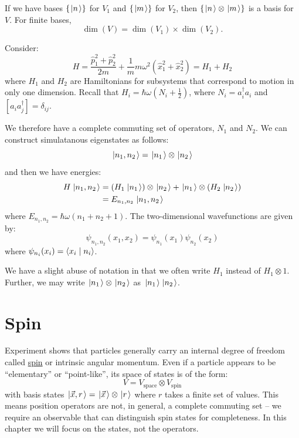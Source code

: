 \documentclass[../Main.tex]{subfiles}
\begin{document}
\begin{remark}
    If we have bases $\{\left.\left|n\right.\right\rangle\}$ for $V_1$ and $\{\left.\left|m\right.\right\rangle\}$ for $V_2$, then $\{\left.\left|n\right.\right\rangle \otimes \left.\left|m\right.\right\rangle\}$ is a basis for $V$. For finite bases,
    \begin{equation*}
        \dim(V) = \dim(V_1) \times \dim(V_2).
    \end{equation*}
\end{remark}
\begin{example}
    Consider:
    \begin{equation*}
        H = \frac{\hat{p}_1^2 + \hat{p}_2^2}{2m} + \frac1m m \omega^2\left(\hat{x}_1^2 + \hat{x}_2^2\right) = H_1 + H_2
    \end{equation*}
    where $H_1$ and $H_2$ are Hamiltonians for subsystems that correspond to motion in only one dimension. Recall that $H_i = \hbar \omega\left(N_i + \frac12\right)$, where $N_i = a_i^\dagger a_i$ and $[a_i a_j^\dagger] = \delta_{ij}$.

    We therefore have a complete commuting set of operators, $N_1$ and $N_2$. We can construct simulatanous eigenstates as follows:
    \begin{equation*}
        \left.\left|n_1, n_2\right.\right\rangle = \left.\left|n_1\right.\right\rangle \otimes \left.\left|n_2\right.\right\rangle
    \end{equation*}
    and then we have energies:
    \begin{align*}
        H\left.\left|n_1, n_2\right.\right\rangle &= \left(H_1 \left.\left|n_1\right.\right\rangle\right) \otimes \left.\left|n_2\right.\right\rangle + \left.\left|n_1\right.\right\rangle \otimes \left(H_2 \left.\left|n_2\right.\right\rangle\right) \\
        &= E_{n_1, n_2} \left.\left|n_1, n_2\right.\right\rangle
    \end{align*}
    where $E_{n_1, n_2} = \hbar \omega \left(n_1 + n_2 + 1\right)$. The two-dimensional wavefunctions are given by:
    \begin{equation*}
        \psi_{n_1, n_2}(x_1, x_2) = \psi_{n_1}(x_1) \psi_{n_2}(x_2)
    \end{equation*}
    where $\psi_{n_i}(x_i) = \langle x_i\mid n_i\rangle$.
\end{example}
\begin{remark}
    We have a slight abuse of notation in that we often write $H_1$ instead of $H_1 \otimes 1$. Further, we may write $\left.\left|n_1\right.\right\rangle \otimes \left.\left|n_2\right.\right\rangle$ as $\left.\left|n_1\right.\right\rangle \left.\left|n_2\right.\right\rangle$.
\end{remark}
\section{Spin}
Experiment shows that particles generally carry an internal degree of freedom called \underline{spin} or intrinsic angular momentum. Even if a particle appears to be ``elementary'' or ``point-like'', its space of states is of the form:
\begin{equation*}
    V = V_{\text{space}} \otimes V_{\text{spin}}
\end{equation*}
with basis states $\left.\left|\vec{x}, r\right.\right\rangle = \left.\left|\vec{x}\right.\right\rangle \otimes \left.\left|r\right.\right\rangle$ where $r$ takes a finite set of values. This means position operators are not, in general, a complete commuting set -- we require an observable that can distinguish spin states for completeness. In this chapter we will focus on the states, not the operators.
\end{document}
